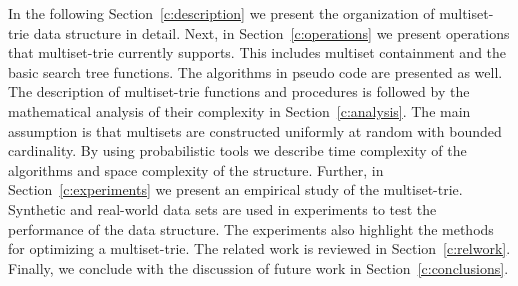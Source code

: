 %

In the following Section~\ref{c:description} we present the organization of 
multiset-trie data structure in detail.
%
Next, in Section~\ref{c:operations} we present operations that multiset-trie currently 
supports. This includes multiset containment and the basic search tree functions. 
The algorithms in pseudo code are presented as well. 
%
The description of multiset-trie functions and procedures is followed by the 
mathematical analysis of their complexity in Section~\ref{c:analysis}. 
The main assumption is that multisets are constructed uniformly at random 
with bounded cardinality. By using probabilistic tools we describe time complexity of 
the algorithms and space complexity of the structure.
%
Further, in Section~\ref{c:experiments} we present an empirical study of the 
multiset-trie. Synthetic and real-world data sets are used in experiments to test the performance 
of the data structure. The experiments also highlight the methods for optimizing a multiset-trie.
%
The related work is reviewed in Section~\ref{c:relwork}. 
%
Finally, we conclude with the discussion of future work in Section~\ref{c:conclusions}.
%